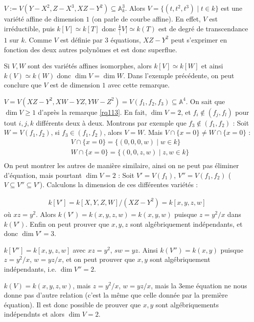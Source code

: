             \begin{expl}
                $V := V(Y - X^2, Z - X^3, XZ - Y^2) \subseteq \mathbb{A}^3_k$. Alors $V = \{(t,t^2, t^3) \mid t \in k\}$ est une variété affine de dimension $1$ (on parle de courbe affine). En effet, $V$ est irréductible, puis $k[V] \simeq k[T]$ donc $\frac k[V] \simeq k(T)$ est de degré de transcendance $1$ sur $k$. Comme $V$ est définie par $3$ équations, $XZ - Y^2$ peut s'exprimer en fonction des deux autres polynômes et est donc superflue.
            \end{expl}
            \begin{remq}
                Si $V,W$ sont des variétés affines isomorphes, alors $k[V] \simeq k[W]$ et ainsi $k(V) \simeq k(W)$ donc $\dim V = \dim W$. Dans l'exemple précédente, on peut conclure que $V$ est de dimension $1$ avec cette remarque.
            \end{remq}
            \begin{expl}
                $V = V(XZ - Y^2 ,  XW - YZ, YW - Z^2) = V(f_1, f_2, f_3) \subseteq \mathbb{A}^4$. On sait que $\dim V \geq 1$ d'après la remarque \ref{rq113}. En fait, $\dim V = 2$, et $f_i \notin (f_j, f_l)$ pour tout $i,j,k$ différents deux à deux. Montrons par exemple que $f_3 \notin (f_1, f_2)$ : Soit $W = V(f_1, f_2)$, si $f_3 \in (f_1, f_2)$, alors $V = W$. Mais $V \cap \{x = 0\} \neq W \cap \{x = 0\}$ :
                \begin{align*}
                    &V \cap \{x = 0\} = \{(0,0,0,w) \mid w \in k\} \\
                    &W \cap \{x = 0\} = \{(0,0,z,w) \mid z,w \in k\} \\
                \end{align*}
                On peut montrer les autres de manière similaire, ainsi on ne peut pas éliminer d'équation, mais pourtant $\dim V = 2$ : Soit $V' = V(f_1)$, $V'' = V(f_1, f_2)$ ($V \subseteq V'' \subseteq V'$). Calculons la dimension de ces différentes variétés :
                \item 
                \begin{align*}
                    k[V'] = k[X,Y,Z,W]/(XZ - Y^2) = k[x,y,z,w]
                \end{align*}
                où $xz = y^2$. Alors $k(V') = k(x,y,z,w) = k(x,y,w)$ puisque $z = y^2/x$ dans $k(V')$. Enfin on peut prouver que $x,y,z$ sont algébriquement indépendants, et donc $\dim V' = 3$. 
                \item $k[V''] = k[x,y,z,w]$ avec $xz = y^2$, $sw = yz$. Ainsi $k(V'') = k(x,y)$ puisque $z = y^2/x$, $w = yz/x$, et on peut prouver que $x,y$ sont algébriquement indépendants, i.e. $\dim V'' = 2$. 
                \item $k(V) = k(x,y,z,w)$, mais $z = y^2/x$, $w = yz/x$, mais la $3$eme équation ne nous donne pas d'autre relation (c'est la même que celle donnée par la première équation). Il est donc possible de prouver que $x,y$ sont algébriquements indépendnts et alors $\dim V = 2$.
            \end{expl}

